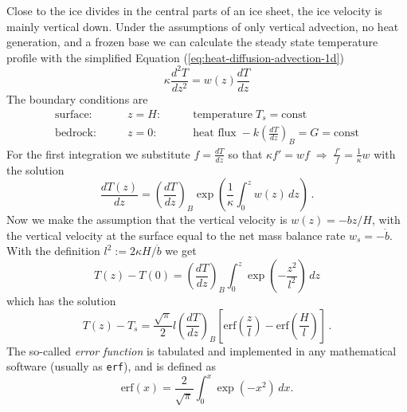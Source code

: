 \documentclass[parskip=half]{scrartcl}
\begin{document}
Close to the ice divides in the central parts of an ice sheet, the ice
velocity is mainly vertical down.  Under the assumptions of only
vertical advection, no heat generation, and a frozen base we can
calculate the steady state temperature profile with the simplified
Equation (\ref{eq:heat-diffusion-advection-1d})
%
\begin{equation}
 \label{eq:heat-diffusion-advection-1d-steady} \kappa \frac{d^2T}{d
z^2} = w(z) \frac{d T}{d z}
\end{equation}
%
The boundary conditions are
\begin{align*} \text{surface:} \qquad & z=H: &\qquad
\text{temperature}\;T_s = \text{const}\\ \text{bedrock:} \qquad & z=0:
&\qquad \text{heat flux}\;-k \left(\frac{dT}{dz}\right)_{B} = G =
\text{const}
\end{align*}
%
For the first integration we substitute $f = \frac{dT}{dz}$ so that
$\kappa f' = wf \; \Longrightarrow \; \frac{f' }{f} = \frac{1}{\kappa}
w$ with the solution
%
\begin{equation}
 \label{eq:8} \frac{dT(z)}{dz} = \left(\frac{dT}{dz}\right)_{B} \exp
\left( \frac{1}{\kappa} \int_0^z w(z)\, dz \right)\,.
\end{equation}
%
Now we make the assumption that the vertical velocity is $w(z) = -b
z/H$, with the vertical velocity at the surface equal to the net mass
balance rate $w_{s} = -\dot{b}$.  With the definition $l^2 := 2\kappa
H /\dot{b}$ we get
%
\begin{equation}
 \label{eq:10} T(z) - T(0) = \left(\frac{dT}{dz}\right)_{B} \int_0^z
\exp \left(-\frac{z^2}{l^2} \right) \,dz
\end{equation}
%
which has the solution
%
\begin{equation}
 \label{eq:11} T(z) - T_s = \frac{\sqrt\pi}{2} l
\left(\frac{dT}{dz}\right)_{B} \left[ {\textrm{erf}} \left(
\frac{z}{l} \right) - {\textrm{erf}} \left( \frac{H}{l} \right)
\right]\,.
\end{equation}
%
The so-called \emph{error function} is tabulated and implemented in
any mathematical software (usually as \texttt{erf}), and is defined as
%
\begin{equation*}
 \label{eq:12} {\textrm{erf}}(x) = \frac{2}{\sqrt{\pi}} \int_0^x
\exp(-x^2) \, dx.
\end{equation*}
\end{document}
